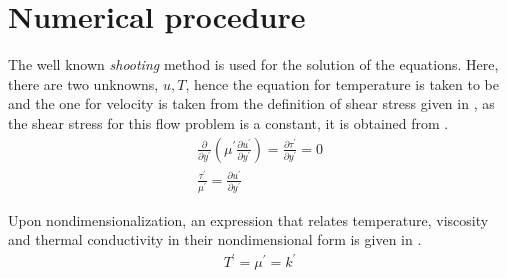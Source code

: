 \section{Numerical procedure}
The well known \emph{shooting} method is used for the solution of the equations. Here,
there are two unknowns, $u, T$, hence the equation for temperature is taken to be
 and the one for velocity is taken from the definition of shear stress
given in , as the shear stress for this flow problem is a constant, it
is obtained from .
\begin{align}
    \frac{\partial}{\partial y^\prime} \left(\mu^\prime\frac{\partial u^\prime}{\partial y^\prime}\right) = \frac{\partial \tau^\prime}{\partial y^\prime} = 0 \nonumber \\
    \frac{\tau^\prime}{\mu^\prime} = \frac{\partial u^\prime}{\partial y^\prime} \label{tau_eqn}
\end{align}

\par Upon nondimensionalization, an expression that relates temperature,
viscosity and thermal conductivity in their nondimensional form is given in
.
\begin{align}
    T^\prime = \mu^\prime = k^\prime \label{ktmu_eqn}
\end{align}

